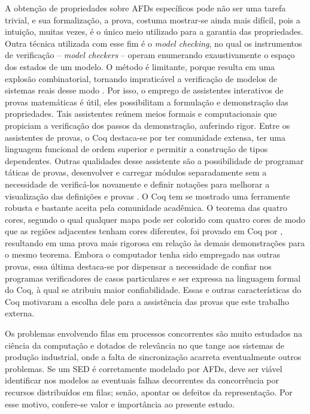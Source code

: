 A obtenção de propriedades sobre AFDs específicos pode não ser uma tarefa trivial, e sua formalização, a prova, costuma mostrar-se ainda mais difícil, pois a intuição, muitas vezes, é o único meio utilizado para a garantia das propriedades. Outra técnica utilizada com esse fim é o \textit{model checking}, no qual os instrumentos de verificação -- \textit{model checkers} -- operam enumerando exaustivamente o espaço dos estados de um modelo. O método é limitante, porque resulta em uma explosão combinatorial, tornando impraticável a verificação de modelos de sistemas reais desse modo \cite{athalye}. Por isso, o emprego de assistentes interativos de provas matemáticas é útil, eles possibilitam a formulação e demonstração das propriedades. Tais assistentes reúnem meios formais e computacionais que propiciam a verificação dos passos da demonstração, auferindo rigor. Entre os assistentes de provas, o Coq destaca-se por ter comunidade extensa, ter uma linguagem funcional de ordem superior e permitir a construção de tipos dependentes. Outras qualidades desse assistente são a possibilidade de programar táticas de provas, desenvolver e carregar módulos separadamente sem a necessidade de verificá-los novamente e definir notações para melhorar a visualização das definições e provas \cite{manualcoq}. O Coq tem se mostrado uma ferramente robusta e bastante aceita pela comunidade acadêmica. O teorema das quatro cores, segundo o qual qualquer mapa pode ser colorido com quatro cores de modo que as regiões adjacentes tenham cores diferentes, foi provado em Coq por , resultando em uma prova mais rigorosa em relação às demais demonstrações para o mesmo teorema. Embora o computador tenha sido empregado nas outras provas, essa última destaca-se por dispensar a necessidade de confiar nos programas verificadores de casos particulares e ser expressa na linguagem formal do Coq, à qual se atribuiu maior confiabilidade. Essas e outras características do Coq motivaram a escolha dele para a assistência das provas que este trabalho externa.

Os problemas envolvendo filas em processos concorrentes são muito estudados na ciência da computação e dotados de relevância no que tange aos sistemas de produção industrial, onde a falta de sincronização acarreta eventualmente outros problemas. Se um SED é corretamente modelado por AFDs, deve ser viável identificar nos modelos as eventuais falhas decorrentes da concorrência por recursos distribuídos em filas; senão, apontar os defeitos da representação. Por esse motivo, confere-se valor e importância ao presente estudo.

